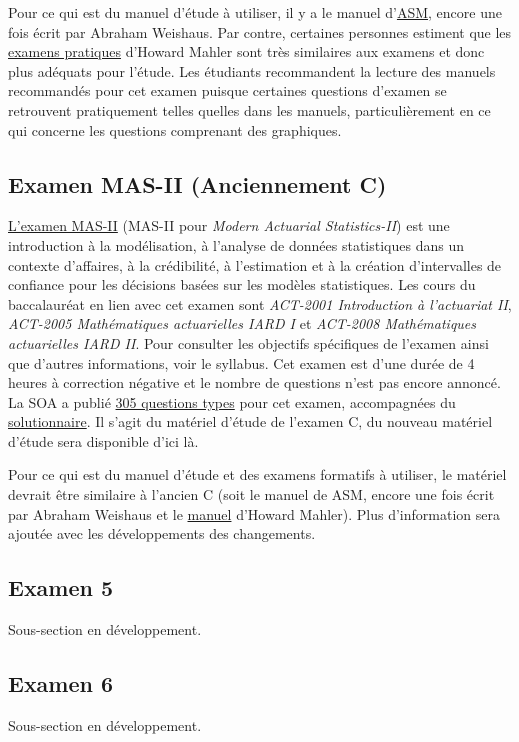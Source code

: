 Pour ce qui est du manuel d'étude à utiliser, il y a le manuel d'\href{https://drive.google.com/open?id=0B6kXivc6X9LISGhkVUkzLW5sSnc}{ASM}, encore une fois écrit par Abraham Weishaus. Par contre, certaines personnes estiment que les \href{https://drive.google.com/open?id=0B6kXivc6X9LIOUs3SDF3NmVKNGM}{examens pratiques} d'Howard Mahler sont très similaires aux examens et donc plus adéquats pour l'étude. Les étudiants recommandent la lecture des manuels recommandés pour cet examen puisque certaines questions d'examen se retrouvent pratiquement telles quelles dans les manuels, particulièrement en ce qui concerne les questions comprenant des graphiques. \vspace{\baselineskip}


\subsection*{Examen MAS-II (Anciennement C)}
\label{subsec:examMAS_II}

\href{http://www.casact.org/admissions/syllabus/index.cfm?fa=MASII&parentID=392}{L'examen MAS-II} (MAS-II pour \textit{Modern Actuarial Statistics-II}) est une introduction à la modélisation, à l'analyse de données statistiques dans un contexte d'affaires, à la crédibilité, à l'estimation et à la création d'intervalles de confiance pour les décisions basées sur les modèles statistiques. Les cours du baccalauréat en lien avec cet examen sont \textit{ACT-2001 Introduction à l'actuariat II}, \textit{ACT-2005 Mathématiques actuarielles IARD I} et \textit{ACT-2008 Mathématiques actuarielles IARD II}. Pour consulter les objectifs spécifiques de l'examen ainsi que d'autres informations, voir le syllabus. Cet examen est d'une durée de 4 heures à correction négative et le nombre de questions n'est pas encore annoncé. La SOA a publié \href{http://www.soa.org/files/edu/edu-exam-c-sample-quest.pdf}{305 questions types} pour cet examen, accompagnées du \href{http://www.soa.org/files/edu/edu-exam-c-sample-sol.pdf}{solutionnaire}. Il s'agit du matériel d'étude de l'examen C, du nouveau matériel d'étude sera disponible d'ici là.\vspace{\baselineskip}

Pour ce qui est du manuel d'étude et des examens formatifs à utiliser, le matériel devrait être similaire à l'ancien C (soit le manuel de ASM, encore une fois écrit par Abraham Weishaus et le \href{http://howardmahler.com/Teaching/C.html}{manuel} d'Howard Mahler). Plus d'information sera ajoutée avec les développements des changements.\vspace{\baselineskip}

\subsection*{Examen 5}
\label{subsec:exam5}

Sous-section en développement. \vspace{\baselineskip}


\subsection*{Examen 6}
\label{subsec:exam6}

Sous-section en développement. \vspace{\baselineskip}


\newpage

